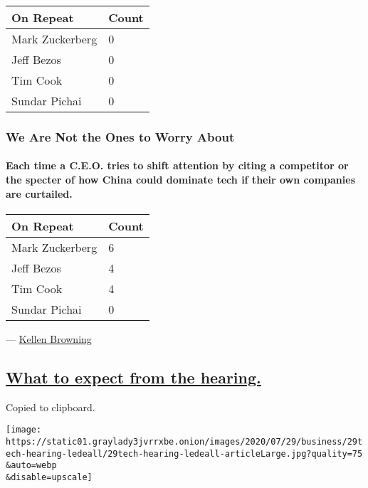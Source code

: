 \begin{longtable}[]{@{}ll@{}}
\toprule
\textbf{On Repeat} & \textbf{Count}\tabularnewline
\midrule
\endhead
Mark Zuckerberg & 0\tabularnewline
Jeff Bezos & 0\tabularnewline
Tim Cook & 0\tabularnewline
Sundar Pichai & 0\tabularnewline
\bottomrule
\end{longtable}

\hypertarget{we-are-not-the-ones-to-worry-about}{%
\subsubsection{We Are Not the Ones to Worry
About}\label{we-are-not-the-ones-to-worry-about}}

\hypertarget{each-time-a-ceo-tries-to-shift-attention-by-citing-a-competitor-or-the-specter-of-how-china-could-dominate-tech-if-their-own-companies-are-curtailed}{%
\paragraph{Each time a C.E.O. tries to shift attention by citing a
competitor or the specter of how China could dominate tech if their own
companies are
curtailed.}\label{each-time-a-ceo-tries-to-shift-attention-by-citing-a-competitor-or-the-specter-of-how-china-could-dominate-tech-if-their-own-companies-are-curtailed}}

\begin{longtable}[]{@{}ll@{}}
\toprule
\textbf{On Repeat} & \textbf{Count}\tabularnewline
\midrule
\endhead
Mark Zuckerberg & 6\tabularnewline
Jeff Bezos & 4\tabularnewline
Tim Cook & 4\tabularnewline
Sundar Pichai & 0\tabularnewline
\bottomrule
\end{longtable}

--- \href{https://www.nytimes3xbfgragh.onion/by/kellen-browning}{Kellen
Browning}

\hypertarget{what-to-expect-from-the-hearing}{%
\subsection{\texorpdfstring{\protect\hyperlink{what-to-expect-from-the-hearing}{What
to expect from the
hearing.}}{What to expect from the hearing.}}\label{what-to-expect-from-the-hearing}}

Copied to clipboard.

\texttt{[image: https://static01.graylady3jvrrxbe.onion/images/2020/07/29/business/29tech-hearing-ledeall/29tech-hearing-ledeall-articleLarge.jpg?quality=75\\\&auto=webp\\\&disable=upscale]}

